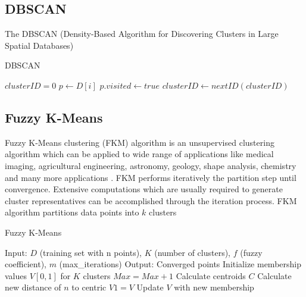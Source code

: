 \documentclass[conference, 10pt]{IEEEtran}
\begin{document}
  \subsection{DBSCAN}
  The DBSCAN (Density-Based Algorithm for Discovering Clusters in Large Spatial Databases)
  \begin{algorithm}
  \caption{DBSCAN}
  \begin{algorithmic}[1]
    \State $clusterID = 0$
        \State $p \gets D[i]$
        \State $p.visited \gets true$    
            \State $clusterID \gets nextID(clusterID)$
          \EndIf
        \EndIf
    \EndFor
  \EndProcedure
  \Statex
  \EndProcedure
  \end{algorithmic}
  \end{algorithm}

  \subsection{Fuzzy K-Means}
  Fuzzy K-Means clustering (FKM) algorithm is an unsupervised clustering algorithm which can be
  applied to wide range of applications like medical imaging, agricultural engineering, astronomy,
  geology, shape analysis, chemistry and many more applications \cite{pattern}. FKM performs iteratively the partition step until convergence. Extensive computations which are usually required to generate cluster representatives can be accomplished through the iteration process. FKM algorithm partitions data points into $k$ clusters

  \begin{algorithm}
  \caption{Fuzzy K-Means}
  \begin{algorithmic}[1]
  \State Input: $D$ (training set with n points), $K$ (number of clusters), $f$ (fuzzy coefficient), $m$ (max\_iterations)
  \State Output: Converged points
    \State Initialize membership values $V[0,1]$ for $K$ clusters
    \State $Max=Max+1$
          \State Calculate centroids $C$
          \State Calculate new distance of $n$ to centric
          \State $V1 = V$
          \State Update $V$ with new membership
      \EndFor
    \EndFor
  \EndProcedure
  \Statex
  \end{algorithmic}
  \end{algorithm}
\end{document}
